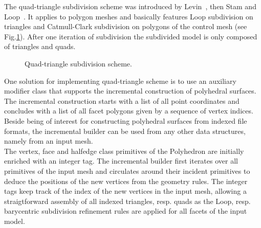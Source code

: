 


The quad-triangle subdivision scheme was introduced by
Levin~\cite{l-pg-03}, then Stam and Loop~\cite{qts}. It applies to
polygon meshes and basically features Loop subdivision on triangles
and Catmull-Clark subdivision on polygons of the control mesh (see
Fig.\ref{fig:quad-triangle}). After one iteration of subdivision the
subdivided model is only composed of triangles and quads.

\begin{figure}
    \caption{Quad-triangle subdivision scheme.}
    \label{fig:quad-triangle}
\end{figure}

One solution for implementing quad-triangle scheme is to use an
auxiliary modifier class that supports the incremental construction of
polyhedral surfaces. The incremental construction starts with a list
of all point coordinates and concludes with a list of all facet
polygons given by a sequence of vertex indices.  Beside being of
interest for constructing polyhedral surfaces from indexed file
formats, the incremental builder can be used from any other data
structures, namely from an input mesh.\\

The vertex, face and halfedge class primitives of the Polyhedron are
initially enriched with an integer tag. The incremental builder first
iterates over all primitives of the input mesh and circulates around
their incident primitives to deduce the positions of the new vertices
from the geometry rules. The integer tags keep track of the index of
the new vertices in the input mesh, allowing a straigtforward assembly
of all indexed triangles, resp. quads as the Loop, resp. barycentric
subdivision refinement rules are applied for all facets of the input
model.

